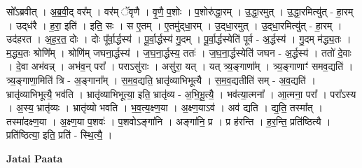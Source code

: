 \documentclass[17pt]{extarticle}
\begin{document}
सो᳚ऽब्रवीत् । अ॒ब्र॒वी॒द् वर᳚म् । वर॑म् ॅवृणै । वृ॒णै॒ प॒शोः । प॒शोरु॑द्धा॒रम् । उ॒द्धा॒रमुत् । उ॒द्धा॒रमित्यु॑त् - हा॒रम् । उद्‍ध॑रै । ह॒रा॒ इति॑ । इति॒ सः । स ए॒तम् । ए॒तमु॑द्‍धा॒रम् । उ॒द्‍धा॒रमुत् । उ॒द्‍धा॒रमित्यु॑त् - हा॒रम् । उद॑हरत । अ॒ह॒र॒त॒ दोः । दोः पू᳚र्वा॒र्द्धस्य॑ । पू॒र्वा॒र्द्धस्य॑ गु॒दम् । पू॒र्वा॒र्द्धस्येति॑ पूर्व - अ॒र्द्धस्य॑ । गु॒दम् म॑द्ध्य॒तः । म॒द्ध्य॒तः श्रोणि᳚म् । श्रोणि॑म् जघना॒र्द्धस्य॑ । ज॒घ॒ना॒र्द्धस्य॒ ततः॑ । ज॒घ॒ना॒र्द्धस्येति॑ जघन - अ॒र्द्धस्य॑ । ततो॑ दे॒वाः । दे॒वा अभ॑वन्न् । अभ॑व॒न् परा᳚ । पराऽसु॑राः । असु॑रा॒ यत् । यत् त्र्य॒ङ्‍गाणा᳚म् । त्र्य॒ङ्‍गाणाꣳ॑ समव॒द्यति॑ । त्र्य॒ङ्‍गाणा॒मिति॑ त्रि - अ॒ङ्‍गाना᳚म् । स॒म॒व॒द्यति॒ भ्रातृ॑व्याभिभूत्यै । स॒म॒व॒द्यतीति॑ सम् - अ॒व॒द्यति॑ । भ्रातृ॑व्याभिभूत्यै॒ भव॑ति । भ्रातृ॑व्याभिभूत्या॒ इति॒ भ्रातृ॑व्य - अ॒भि॒भू॒त्यै॒ । भव॑त्या॒त्मना᳚ । आ॒त्मना॒ परा᳚ । परा᳚ऽस्य । अ॒स्य॒ भ्रातृ॑व्यः । भ्रातृ॑व्यो भवति । भ॒व॒त्य॒क्ष्ण॒या । अ॒क्ष्ण॒याऽव॑ । अव॑ द्यति । द्य॒ति॒ तस्मा᳚त् । तस्मा॑दक्ष्ण॒या । अ॒क्ष्ण॒या प॒शवः॑ । प॒शवोऽङ्‍गा॑नि । अङ्‍गा॑नि॒ प्र । प्र ह॑रन्ति । ह॒र॒न्ति॒ प्रति॑ष्ठित्यै । प्रति॑ष्ठित्या॒ इति॒ प्रति॑ - स्थि॒त्यै॒ । \newline

\textbf{Jatai Paata} \newline
\end{document}
